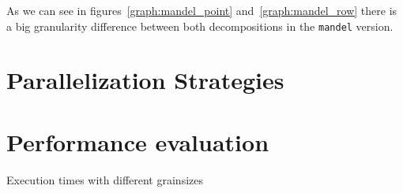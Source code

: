 As we can see in figures~\ref{graph:mandel_point} and~\ref{graph:mandel_row} there is a big granularity difference between both decompositions in the \texttt{mandel} version.



\section{Parallelization Strategies}%
\label{sec:Parallelization Strategies}



\section{Performance evaluation}%
\label{sec:Performance evaluation}


\begin{table}[H]
    \caption{Execution times with different grainsizes}%
    \label{tab:grainsize}
    \begin{center}
    
    \end{center}
\end{table}

